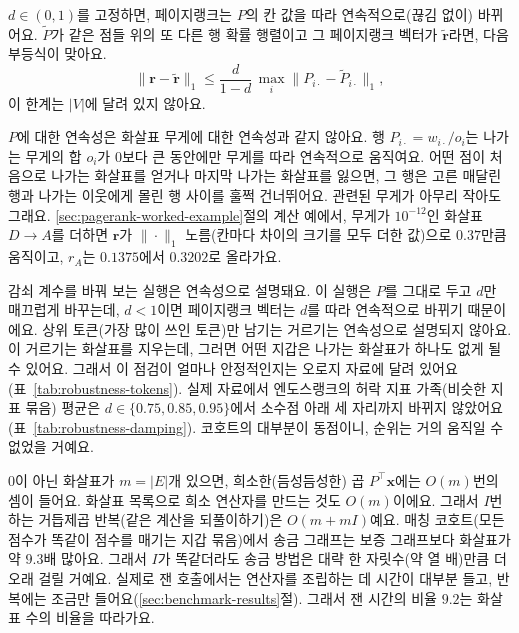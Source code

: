 
$d\in(0,1)$를 고정하면, 페이지랭크는 $P$의 칸 값을 따라 연속적으로(끊김 없이) 바뀌어요. $\tilde P$가 같은 점들 위의 또 다른 행 확률 행렬이고 그 페이지랭크 벡터가 $\tilde{\mathbf{r}}$라면, 다음 부등식이 맞아요.
\[
\|\mathbf{r}-\tilde{\mathbf{r}}\|_1\le\frac{d}{1-d}\,\max_i\bigl\|P_{i\cdot}-\tilde P_{i\cdot}\bigr\|_1,
\]
이 한계는 $|V|$에 달려 있지 않아요.

$P$에 대한 연속성은 화살표 무게에 대한 연속성과 같지 않아요. 행 $P_{i\cdot}=w_{i\cdot}/o_i$는 나가는 무게의 합 $o_i$가 0보다 큰 동안에만 무게를 따라 연속적으로 움직여요. 어떤 점이 처음으로 나가는 화살표를 얻거나 마지막 나가는 화살표를 잃으면, 그 행은 고른 매달린 행과 나가는 이웃에게 몰린 행 사이를 훌쩍 건너뛰어요. 관련된 무게가 아무리 작아도 그래요. \ref{sec:pagerank-worked-example}절의 계산 예에서, 무게가 $10^{-12}$인 화살표 $D\to A$를 더하면 $\mathbf{r}$가 $\|\cdot\|_1$ 노름(칸마다 차이의 크기를 모두 더한 값)으로 $0.37$만큼 움직이고, $r_A$는 $0.1375$에서 $0.3202$로 올라가요.

감쇠 계수를 바꿔 보는 실행은 연속성으로 설명돼요. 이 실행은 $P$를 그대로 두고 $d$만 매끄럽게 바꾸는데, $d<1$이면 페이지랭크 벡터는 $d$를 따라 연속적으로 바뀌기 때문이에요. 상위 토큰(가장 많이 쓰인 토큰)만 남기는 거르기는 연속성으로 설명되지 않아요. 이 거르기는 화살표를 지우는데, 그러면 어떤 지갑은 나가는 화살표가 하나도 없게 될 수 있어요. 그래서 이 점검이 얼마나 안정적인지는 오로지 자료에 달려 있어요(표~\ref{tab:robustness-tokens}). 실제 자료에서 엔도스랭크의 허락 지표 가족(비슷한 지표 묶음) 평균은 $d\in\{0.75,0.85,0.95\}$에서 소수점 아래 세 자리까지 바뀌지 않았어요(표~\ref{tab:robustness-damping}). 코호트의 대부분이 동점이니, 순위는 거의 움직일 수 없었을 거예요.


0이 아닌 화살표가 $m=|E|$개 있으면, 희소한(듬성듬성한) 곱 $P^{\top}\mathbf{x}$에는 $O(m)$번의 셈이 들어요. 화살표 목록으로 희소 연산자를 만드는 것도 $O(m)$이에요. 그래서 $I$번 하는 거듭제곱 반복(같은 계산을 되풀이하기)은 $O(m+mI)$예요. 매칭 코호트(모든 점수가 똑같이 점수를 매기는 지갑 묶음)에서 송금 그래프는 보증 그래프보다 화살표가 약 $9.3$배 많아요. 그래서 $I$가 똑같더라도 송금 방법은 대략 한 자릿수(약 열 배)만큼 더 오래 걸릴 거예요. 실제로 잰 호출에서는 연산자를 조립하는 데 시간이 대부분 들고, 반복에는 조금만 들어요(\ref{sec:benchmark-results}절). 그래서 잰 시간의 비율 $9.2$는 화살표 수의 비율을 따라가요.


